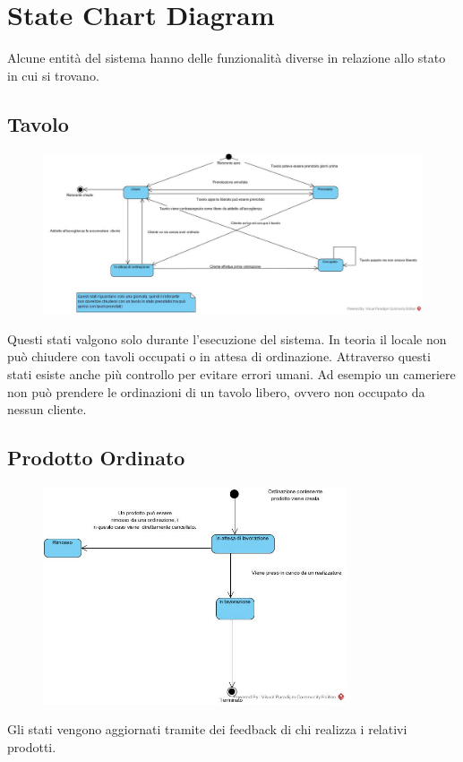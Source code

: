 \section{State Chart Diagram}
Alcune entità del sistema hanno delle funzionalità diverse in relazione allo stato in cui si trovano.

\subsection{Tavolo}
\begin{figure}[H]
	\centering
	\includegraphics[width=1\textwidth]{Immagini/stati_tavolo.jpg}
\end{figure}
Questi stati valgono solo durante l'esecuzione del sistema. In teoria il locale non può chiudere con tavoli occupati o in attesa di ordinazione. Attraverso questi stati esiste anche più controllo per evitare errori umani. Ad esempio un cameriere non può prendere le ordinazioni di un tavolo libero, ovvero non occupato da nessun cliente.

\subsection{Prodotto Ordinato}
\begin{figure}[H]
	\centering
	\includegraphics[width=0.8\textwidth]{Immagini/stati_prodotti_ordinati.jpg}
\end{figure}
Gli stati vengono aggiornati tramite dei feedback di chi realizza i relativi prodotti.

